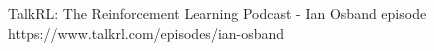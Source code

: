 \documentclass[preview]{standalone}
\begin{document}
TalkRL: The Reinforcement Learning Podcast - Ian Osband episode https://www.talkrl.com/episodes/ian-osband\\
\end{document}

